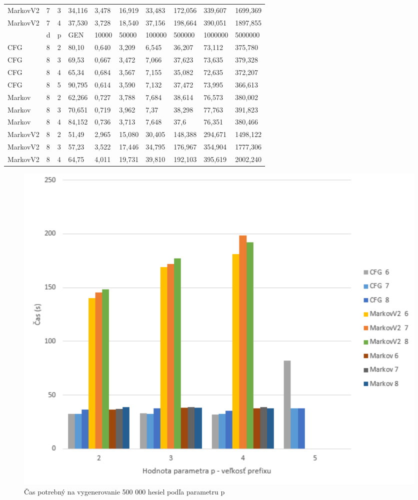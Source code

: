 \begin{table}[]
\begin{tabular}{lll|lllllll}
MarkovV2 & 7 & 3 & 34,116     & 3,478  & 16,919  & 33,483  & 172,056 & 339,607  & 1699,369  \\
MarkovV2 & 7 & 4 & 37,530     & 3,728   & 18,540 & 37,156 & 198,664 & 390,051 & 1897,855 \\ \hline
       & d & p & GEN     & 10000  & 50000  & 100000 & 500000 & 1000000 & 5000000 \\ \hline
CFG    & 8 & 2 & 80,10   & 0,640  & 3,209  & 6,545  & 36,207 & 73,112  & 375,780 \\
CFG    & 8 & 3 & 69,53   & 0,667  & 3,472   & 7,066  & 37,623 & 73,635  & 379,328 \\
CFG    & 8 & 4 & 65,34   & 0,684  & 3,567  & 7,155  & 35,082 & 72,635  & 372,207 \\
CFG    & 8 & 5 & 90,795 & 0,614 & 3,590 & 7,132 & 37,472 & 73,995 & 366,613 \\
Markov & 8 & 2 & 62,266 & 0,727 & 3,788 & 7,684 & 38,614 & 76,573 & 380,002 \\
Markov & 8 & 3 & 70,651 & 0,719 & 3,962 & 7,37  & 38,298 & 77,763 & 391,823 \\
Markov & 8 & 4 & 84,152 & 0,736 & 3,713 & 7,648 & 37,6   & 76,351 & 380,466 \\
MarkovV2 & 8 & 2 & 51,49     & 2,965  & 15,080  & 30,405  & 148,388  & 294,671  & 1498,122 \\
MarkovV2 & 8 & 3 & 57,23     & 3,522  & 17,446  & 34,795 & 176,967 & 354,904  & 1777,306 \\
MarkovV2 & 8 & 4 & 64,75     & 4,011 & 19,731 & 39,810 & 192,103 & 395,619  & 2002,240
\end{tabular}
\end{table}

\begin{figure}[ht]
    \centering
    \includegraphics[width=1\textwidth]{fixedNTime}
    \caption{Čas potrebný na vygenerovanie 500 000 hesiel podľa parametru p}
    \label{fig:fixedNTime}
\end{figure}

